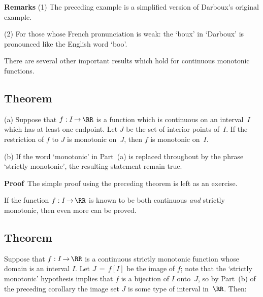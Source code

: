 \V

        {\bf Remarks} (1) The preceding example is a simplified version of Darboux's original example.

\V

        (2) For those whose French pronunciation is weak: the `boux' in `Darboux' is pronounced like the English word `boo'.

\VV


        There are several other important results which hold for continuous monotonic functions.

\V

            \subsection{\small{\bf Theorem}}
            \label{ThmD25.55B}

\V

\hspace*{\parindent}(a) Suppose that $f:I \,{\rightarrow}\, {\RR}$ is a function which is continuous on an interval~$I$ which has at least one endpoint.
    Let $J$ be the set of interior points of~$I$. If the restriction of $f$ to $J$ is monotonic on~$J$, then $f$ is monotonic on~$I$.

\V

        (b) If the word `monotonic' in Part~(a) is replaced throughout by the phrase `strictly monotonic', the resulting statement remain true.

\V

        {\bf Proof}\, The simple proof using the preceding theorem is left as an exercise. %

\VV


        If the function $f:I \,{\rightarrow}\, {\RR}$ is known to be both continuous {\em and} strictly monotonic, then even more can be proved.

\V

            \subsection{\small{\bf Theorem}}
            \label{ThmD25.55C}

\V

        Suppose that $f:I \,{\rightarrow}\, {\RR}$ is a continuous strictly monotonic function whose domain is an interval $I$.
    Let $J \,=\, f[I]$ be the image of $f$; note that the `strictly monotonic' hypothesis implies that $f$ is a bijection of $I$ onto~$J$,
    so by Part~(b) of the preceding corollary the image set $J$ is some type of interval in~${\RR}$. Then:

